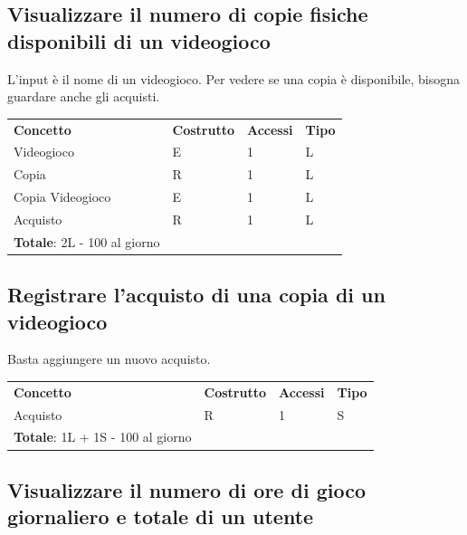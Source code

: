 \documentclass[a4paper,12pt]{report}
\begin{document}
\subsection*{Visualizzare il numero di copie fisiche disponibili di un videogioco}

L'input è il nome di un videogioco. Per vedere se una copia è disponibile, bisogna guardare anche gli acquisti.

\begin{table}[h!]
\begin{center}
	\begin{tabular}{ | m{4cm} P{4cm} P{4cm} P{4cm} | }
	\textbf{Concetto} & \textbf{Costrutto} & \textbf{Accessi} & \textbf{Tipo} \\
	Videogioco       & E & 1 & L \\ \hline
	Copia		   & R & 1 & L \\ \hline
	Copia Videogioco & E & 1 & L \\ \hline
	Acquisto 		   & R & 1 & L \\ \hline
	\textbf{Totale}: 2L - 100 al giorno & & & \\
	\hline
	\end{tabular}
\end{center}
\end{table}

\newpage

\subsection*{Registrare l'acquisto di una copia di un videogioco}

Basta aggiungere un nuovo acquisto.

\begin{table}[h!]
\begin{center}
	\begin{tabular}{ | m{4cm} P{4cm} P{4cm} P{4cm} | }
	\textbf{Concetto} & \textbf{Costrutto} & \textbf{Accessi} & \textbf{Tipo} \\
	Acquisto & R & 1 & S \\ \hline
	\textbf{Totale}: 1L + 1S - 100 al giorno & & & \\
	\hline
	\end{tabular}
\end{center}
\end{table}

\subsection*{Visualizzare il numero di ore di gioco giornaliero e totale di un utente}
\end{document}
